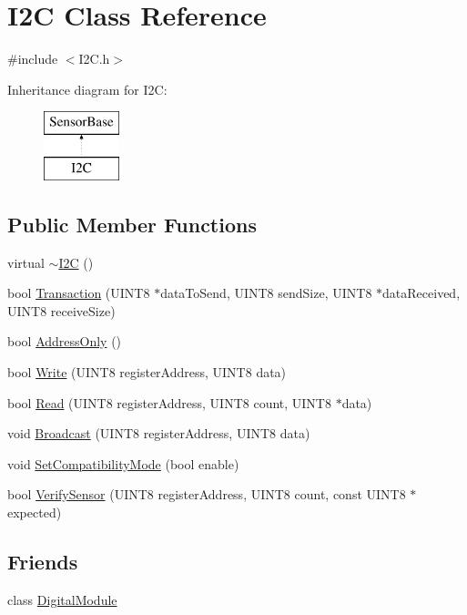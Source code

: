 \hypertarget{classI2C}{
\section{I2C Class Reference}
\label{classI2C}
}


{\ttfamily \#include $<$I2C.h$>$}

Inheritance diagram for I2C:\begin{figure}[H]
\begin{center}
\leavevmode
\includegraphics[height=2.000000cm]{classI2C}
\end{center}
\end{figure}
\subsection*{Public Member Functions}
\begin{DoxyCompactItemize}
\item 
virtual \hyperlink{classI2C_afaad09fa9bdd23623bddbdcd7585a9fe}{$\sim$I2C} ()
\item 
bool \hyperlink{classI2C_ad2b8c000febc0a7c2444844da3a1886a}{Transaction} (UINT8 $\ast$dataToSend, UINT8 sendSize, UINT8 $\ast$dataReceived, UINT8 receiveSize)
\item 
bool \hyperlink{classI2C_a8aaad56f53bdbc0817a6d70ce0361fcd}{AddressOnly} ()
\item 
bool \hyperlink{classI2C_a789fbbfb29d01484527996c26b618b80}{Write} (UINT8 registerAddress, UINT8 data)
\item 
bool \hyperlink{classI2C_ae50e3e7fb5c896762c6a785f8d85cdc2}{Read} (UINT8 registerAddress, UINT8 count, UINT8 $\ast$data)
\item 
void \hyperlink{classI2C_aab8d364d14d9265a399c7e0730213672}{Broadcast} (UINT8 registerAddress, UINT8 data)
\item 
void \hyperlink{classI2C_af4c0a331591f394ae78e3ab03c0d6520}{SetCompatibilityMode} (bool enable)
\item 
bool \hyperlink{classI2C_a0d2101f590b7df2034c4239896f071c3}{VerifySensor} (UINT8 registerAddress, UINT8 count, const UINT8 $\ast$expected)
\end{DoxyCompactItemize}
\subsection*{Friends}
\begin{DoxyCompactItemize}
\item 
\hypertarget{classI2C_aa15053da4e6cbe2d051a32116bcfbf2b}{
class \hyperlink{classI2C_aa15053da4e6cbe2d051a32116bcfbf2b}{DigitalModule}}
\label{classI2C_aa15053da4e6cbe2d051a32116bcfbf2b}

\end{DoxyCompactItemize}


